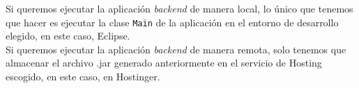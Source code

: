         Si queremos ejecutar la aplicación \textit{backend} de manera local, lo único que tenemos que hacer es ejecutar la clase \texttt{Main} de la aplicación en el entorno de desarrollo elegido, en este caso, Eclipse. \\
        \newline
        Si queremos ejecutar la aplicación \textit{backend} de manera remota, solo tenemos que almacenar el archivo .jar generado anteriormente en el servicio de Hosting escogido, en este caso, en Hostinger\cite{hostinger}.
        
        
        
        
    